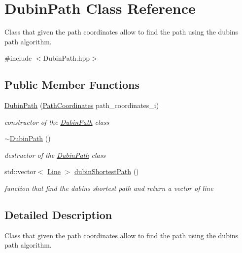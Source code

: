\hypertarget{class_dubin_path}{}\section{Dubin\+Path Class Reference}
\label{class_dubin_path}


Class that given the path coordinates allow to find the path using the dubins path algorithm.  




{\ttfamily \#include $<$Dubin\+Path.\+hpp$>$}

\subsection*{Public Member Functions}
\begin{DoxyCompactItemize}
\item 
\mbox{\hyperlink{class_dubin_path_a095a22d8f3c9780b09fc1e48be9011b3}{Dubin\+Path}} (\mbox{\hyperlink{class_path_coordinates}{Path\+Coordinates}} path\+\_\+coordinates\+\_\+i)
\begin{DoxyCompactList}\small\item\em constructor of the \mbox{\hyperlink{class_dubin_path}{Dubin\+Path}} class \end{DoxyCompactList}\item 
\mbox{\label{class_dubin_path_a89b962b8ff3bf5cbb9fda6d539bb7a9c}} 
\mbox{\hyperlink{class_dubin_path_a89b962b8ff3bf5cbb9fda6d539bb7a9c}{$\sim$\+Dubin\+Path}} ()
\begin{DoxyCompactList}\small\item\em destructor of the \mbox{\hyperlink{class_dubin_path}{Dubin\+Path}} class \end{DoxyCompactList}\item 
std\+::vector$<$ \mbox{\hyperlink{class_line}{Line}} $>$ \mbox{\hyperlink{class_dubin_path_a260513ceab4e25a5a8867ea2701fbb68}{dubin\+Shortest\+Path}} ()
\begin{DoxyCompactList}\small\item\em function that find the dubins shortest path and return a vector of line \end{DoxyCompactList}\end{DoxyCompactItemize}


\subsection{Detailed Description}
Class that given the path coordinates allow to find the path using the dubins path algorithm. 

